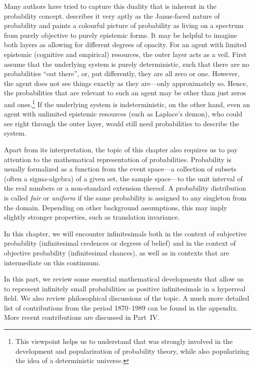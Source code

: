 Many authors have tried to capture this duality that is inherent in the probability concept. \citet{Hacking:1975} describes it very aptly as the Janus-faced nature of probability and \citet{Gaifman:1986} paints a colourful picture of probability as living on a spectrum from purely objective to purely epistemic forms.
It may be helpful to imagine both layers as allowing for different degrees of opacity.
For an agent with limited epistemic (cognitive and empirical) resources, the outer layer acts as a veil.
First assume that the underlying system is purely deterministic, such that there are no probabilities ``out there'', or, put differently, they are all zero or one. However, the agent does not see things exactly as they are---only approximately so. Hence, the probabilities that are relevant to such an agent may be other than just zeros and ones.\footnote{This viewpoint helps us to understand that \citet{Laplace:1814} was strongly involved in the development and popularization of probability theory, while also popularizing the idea of a deterministic universe.} If the underlying system is indeterministic, on the other hand, even an agent with unlimited epistemic resources (such as Laplace's demon), who could see right through the outer layer, would still need probabilities to describe the system.

%

Apart from its interpretation, the topic of this chapter also requires us to pay attention to the mathematical representation of probabilities. Probability is usually formalized as a function from the event space---a collection of subsets (often a sigma-algebra) of a given set, the sample space---to the unit interval of the real numbers or a non-standard extension thereof. A probability distribution is called \textit{fair} or \textit{uniform} if the same probability is assigned to any singleton from the domain. Depending on other background assumptions, this may imply slightly stronger properties, such as translation invariance.

In this chapter, we will encounter infinitesimals both in the context of subjective probability (infinitesimal credences or degrees of belief) and in the context of objective probability (infinitesimal chances), as well as in contexts that are intermediate on this continuum.

\label{part:hist}

\noindent In this part, we review some essential mathematical developments that allow us to represent infinitely small probabilities as positive infinitesimals in a hyperreal field. We also review philosophical discussions of the topic. A much more detailed list of contributions from the period 1870--1989 can be found in the appendix. More recent contributions are discussed in Part~IV.

